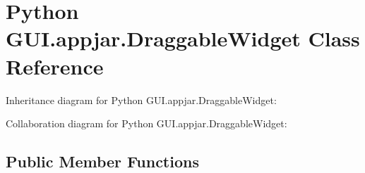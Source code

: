 \hypertarget{class_python_01_g_u_i_1_1appjar_1_1_draggable_widget}{}\section{Python G\+U\+I.\+appjar.\+Draggable\+Widget Class Reference}
\label{class_python_01_g_u_i_1_1appjar_1_1_draggable_widget}


Inheritance diagram for Python G\+U\+I.\+appjar.\+Draggable\+Widget\+:


Collaboration diagram for Python G\+U\+I.\+appjar.\+Draggable\+Widget\+:
\subsection*{Public Member Functions}

